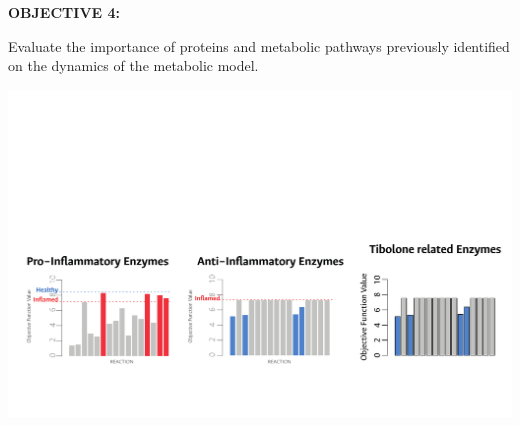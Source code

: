 \documentclass[11pt]{beamer}
\begin{document}
\begin{frame}
\begin{block}{\textbf{OBJECTIVE 4:}}
\begin{center}
Evaluate the importance of proteins and metabolic pathways previously identified on the dynamics of the metabolic model.\end{center}\end{block}
\end{frame}
\begin{frame}
\begin{center}
\includegraphics[width=\textwidth]{Networks}
\end{center}
\end{frame}
\end{document}
